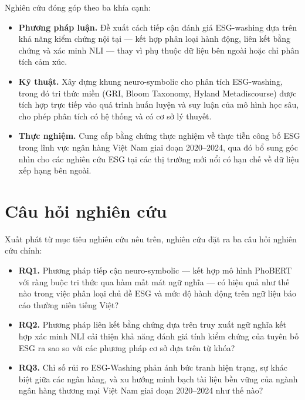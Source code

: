 Nghiên cứu đóng góp theo ba khía cạnh:
\begin{itemize}
    \item \textbf{Phương pháp luận.} Đề xuất cách tiếp cận đánh giá ESG-washing dựa trên khả năng kiểm chứng nội tại --- kết hợp phân loại hành động, liên kết bằng chứng và xác minh NLI --- thay vì phụ thuộc dữ liệu bên ngoài hoặc chỉ phân tích cảm xúc.
    \item \textbf{Kỹ thuật.} Xây dựng khung neuro-symbolic cho phân tích ESG-washing, trong đó tri thức miền (GRI, Bloom Taxonomy, Hyland Metadiscourse) được tích hợp trực tiếp vào quá trình huấn luyện và suy luận của mô hình học sâu, cho phép phân tích có hệ thống và có cơ sở lý thuyết.
    \item \textbf{Thực nghiệm.} Cung cấp bằng chứng thực nghiệm về thực tiễn công bố ESG trong lĩnh vực ngân hàng Việt Nam giai đoạn 2020--2024, qua đó bổ sung góc nhìn cho các nghiên cứu ESG tại các thị trường mới nổi có hạn chế về dữ liệu xếp hạng bên ngoài.
\end{itemize}


\section{Câu hỏi nghiên cứu}
Xuất phát từ mục tiêu nghiên cứu nêu trên, nghiên cứu đặt ra ba câu hỏi nghiên cứu chính:
\begin{itemize}
    \item \textbf{RQ1.} Phương pháp tiếp cận neuro-symbolic --- kết hợp mô hình PhoBERT với ràng buộc tri thức qua hàm mất mát ngữ nghĩa --- có hiệu quả như thế nào trong việc phân loại chủ đề ESG và mức độ hành động trên ngữ liệu báo cáo thường niên tiếng Việt?

    \item \textbf{RQ2.} Phương pháp liên kết bằng chứng dựa trên truy xuất ngữ nghĩa kết hợp xác minh NLI cải thiện khả năng đánh giá tính kiểm chứng của tuyên bố ESG ra sao so với các phương pháp cơ sở dựa trên từ khóa?

    \item \textbf{RQ3.} Chỉ số rủi ro ESG-Washing phản ánh bức tranh hiện trạng, sự khác biệt giữa các ngân hàng, và xu hướng minh bạch tài liệu bền vững của ngành ngân hàng thương mại Việt Nam giai đoạn 2020--2024 như thế nào?
\end{itemize}

